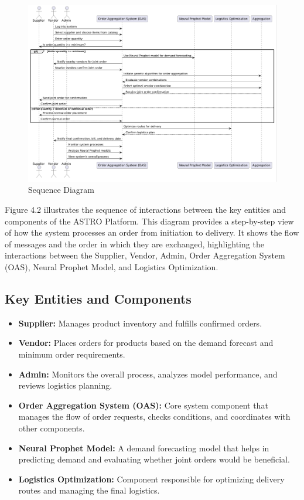 \begin{figure}[H]
    \centering
    \includegraphics[width=1\textwidth]{Figures/Sequence Diagram.PNG}
    \caption{Sequence Diagram}
    \label{fig:sequence-diagram}
\end{figure}
\noindent Figure 4.2 illustrates the sequence of interactions between the key entities and components of the ASTRO Platform. This diagram provides a step-by-step view of how the system processes an order from initiation to delivery. It shows the flow of messages and the order in which they are exchanged, highlighting the interactions between the Supplier, Vendor, Admin, Order Aggregation System (OAS), Neural Prophet Model, and Logistics Optimization.
\subsection{Key Entities and Components}
\begin{itemize}
    \item \textbf{Supplier:} Manages product inventory and fulfills confirmed orders.
    \item \textbf{Vendor:} Places orders for products based on the demand forecast and minimum order requirements.
    \item \textbf{Admin:} Monitors the overall process, analyzes model performance, and reviews logistics planning.
    \item \textbf{Order Aggregation System (OAS):} Core system component that manages the flow of order requests, checks conditions, and coordinates with other components.
    \item \textbf{Neural Prophet Model:} A demand forecasting model that helps in predicting demand and evaluating whether joint orders would be beneficial.
    \item \textbf{Logistics Optimization:} Component responsible for optimizing delivery routes and managing the final logistics.
\end{itemize}

